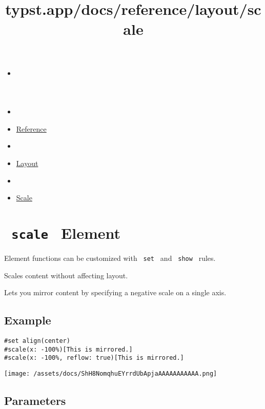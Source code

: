 \title{typst.app/docs/reference/layout/scale}

\begin{itemize}
\tightlist
\item
  \href{/docs}{}
\item
  
\item
  \href{/docs/reference/}{Reference}
\item
  
\item
  \href{/docs/reference/layout/}{Layout}
\item
  
\item
  \href{/docs/reference/layout/scale/}{Scale}
\end{itemize}

\section{\texorpdfstring{\texttt{\ scale\ } {{ Element
}}}{ scale   Element }}\label{summary}

\label{element-tooltip}
Element functions can be customized with \texttt{\ set\ } and
\texttt{\ show\ } rules.

Scales content without affecting layout.

Lets you mirror content by specifying a negative scale on a single axis.

\subsection{Example}\label{example}

\begin{verbatim}
#set align(center)
#scale(x: -100%)[This is mirrored.]
#scale(x: -100%, reflow: true)[This is mirrored.]
\end{verbatim}

\texttt{[image: /assets/docs/ShH8NomqhuEYrrdUbApjaAAAAAAAAAAA.png]}

\subsection{\texorpdfstring{{ Parameters
}}{ Parameters }}\label{parameters}

